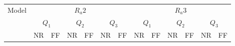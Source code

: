\begin{table*}[h!]
\centering
\small
\begin{tabular}{l|p{0.7cm}p{0.6cm}|p{0.7cm}p{0.6cm}|p{0.7cm}p{0.6cm}|p{0.7cm}p{0.6cm}|p{0.7cm}c|p{0.7cm}p{0.6cm}}
\hline
\multirow{3}{*}{Model} & \multicolumn{6}{c|}{$R_a2$}                                                               & \multicolumn{6}{c}{$R_a3$}                                                                \\ \cline{2-13}
                       & \multicolumn{2}{c}{$Q_1$} & \multicolumn{2}{c}{$Q_2$} & \multicolumn{2}{c|}{$Q_3$} & \multicolumn{2}{c}{$Q_1$} & \multicolumn{2}{c}{$Q_2$} & \multicolumn{2}{c}{$Q_3$} \\ \cline{2-13}
                       & NR           & FF           & NR           & FF           & NR            & FF           & NR           & FF           & NR           & FF           & NR           & FF           \\ \hline



\end{tabular}
\end{table*}
